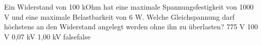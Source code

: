    {Ein Widerstand von 100 kOhm hat eine maximale Spannungsfestigkeit von 1000 V und eine maximale Belastbarkeit von 6 W. Welche Gleichspannung darf höchstens an den Widerstand angelegt werden ohne ihn zu überlasten?}
    {775 V}
    {100 V}
    {0,07 kV}
    {1,00 kV}
    {false}{false}